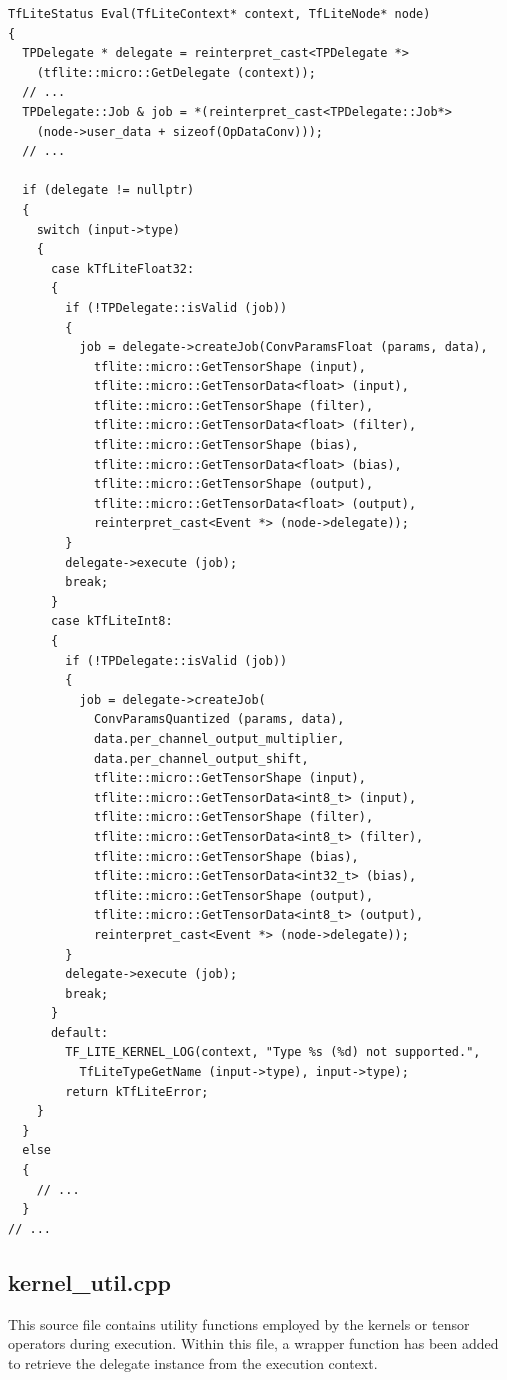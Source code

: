 \begin{verbatim}
TfLiteStatus Eval(TfLiteContext* context, TfLiteNode* node)
{
  TPDelegate * delegate = reinterpret_cast<TPDelegate *>
    (tflite::micro::GetDelegate (context));
  // ...
  TPDelegate::Job & job = *(reinterpret_cast<TPDelegate::Job*>
    (node->user_data + sizeof(OpDataConv)));
  // ...

  if (delegate != nullptr)
  {
    switch (input->type)
    {
      case kTfLiteFloat32:
      {
        if (!TPDelegate::isValid (job))
        {
          job = delegate->createJob(ConvParamsFloat (params, data),
            tflite::micro::GetTensorShape (input),
            tflite::micro::GetTensorData<float> (input),
            tflite::micro::GetTensorShape (filter),
            tflite::micro::GetTensorData<float> (filter),
            tflite::micro::GetTensorShape (bias),
            tflite::micro::GetTensorData<float> (bias),
            tflite::micro::GetTensorShape (output),
            tflite::micro::GetTensorData<float> (output),
            reinterpret_cast<Event *> (node->delegate));
        }
        delegate->execute (job);
        break;
      }
      case kTfLiteInt8:
      {
        if (!TPDelegate::isValid (job))
        {
          job = delegate->createJob(
            ConvParamsQuantized (params, data),
            data.per_channel_output_multiplier,
            data.per_channel_output_shift,
            tflite::micro::GetTensorShape (input),
            tflite::micro::GetTensorData<int8_t> (input),
            tflite::micro::GetTensorShape (filter),
            tflite::micro::GetTensorData<int8_t> (filter),
            tflite::micro::GetTensorShape (bias),
            tflite::micro::GetTensorData<int32_t> (bias),
            tflite::micro::GetTensorShape (output),
            tflite::micro::GetTensorData<int8_t> (output),
            reinterpret_cast<Event *> (node->delegate));
        }
        delegate->execute (job);
        break;
      }
      default:
        TF_LITE_KERNEL_LOG(context, "Type %s (%d) not supported.",
          TfLiteTypeGetName (input->type), input->type);
        return kTfLiteError;
    }
  }
  else
  {
    // ...
  }
// ...
\end{verbatim}

\subsection*{kernel\_util.cpp}
This source file contains utility functions employed by the kernels or tensor operators during execution. Within this file, a wrapper function has been added to retrieve the delegate instance from the execution context.

